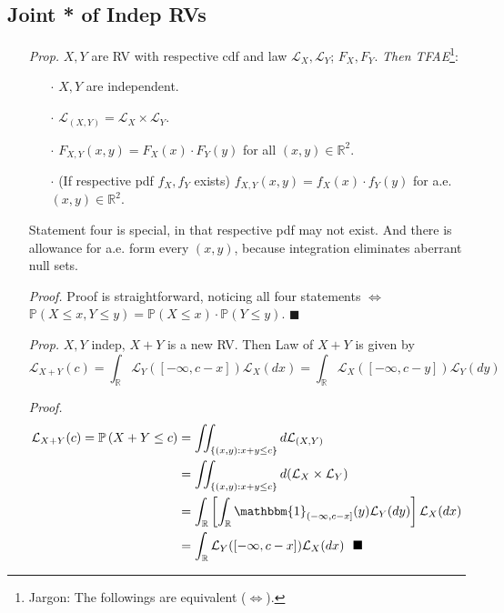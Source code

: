 \documentclass[a4paper,12pt,twoside]{book}
\begin{document}
\subsection{Joint * of Indep RVs}
\begin{itemize}
	\item[\textit{Prop.}] $X,Y$ are RV with respective cdf and law $\mathcal{L}_X, \mathcal{L}_Y$; $F_X, F_Y$. \textit{Then TFAE}\footnote{Jargon: The followings are equivalent ($\iff$).}:
	\begin{itemize}
		\item[$\cdot$] $X,Y$ are independent.
		\item[$\cdot$] $\mathcal{L}_{(X,Y)}=\mathcal{L}_X \times \mathcal{L}_Y$.
		\item[$\cdot$] $F_{X,Y}(x,y)=F_X(x)\cdot F_Y(y)$ for all $(x,y)\in \mathbb{R}^2$.
		\item[$\cdot$] (If respective pdf $f_X, f_Y$ exists) $f_{X,Y}(x,y)=f_X(x) \cdot f_Y(y)$ for a.e. $(x,y)\in \mathbb{R}^2$.
	\end{itemize}
	Statement four is special, in that respective pdf may not exist. And there is allowance for a.e. form every $(x,y)$, because integration eliminates aberrant null sets.
	\item[\textit{Proof.}] Proof is straightforward, noticing all four statements $\iff$ $\mathbb{P}\left(X\leq x, Y\leq y\right)=\mathbb{P}\left(X\leq x\right)\cdot \mathbb{P}\left(Y\leq y\right)$. $\blacksquare$

	\item[\textit{Prop.}] $X,Y$ indep, $X+Y$ is a new RV. Then Law of $X+Y$ is given by
	$$\mathcal{L}_{X+Y}(c)=\int_{\mathbb{R}}\mathcal{L}_Y([-\infty, c-x])\mathcal{L}_X(dx)=\int_{\mathbb{R}}\mathcal{L}_X([-\infty, c-y])\mathcal{L}_Y(dy)$$

	\item[\textit{Proof.}] 
	\begin{equation}
		\begin{split}
			\mathcal{L}_{X+Y}(c)=\mathbb{P}\left(X+Y\leq c\right)&=\iint_{\{(x,y):x+y\leq c\}}d \mathcal{L}_{(X,Y)}\\
			&=\iint_{\{(x,y):x+y\leq c\}}d (\mathcal{L}_{X}\times \mathcal{L}_Y)\\
			&=\int_{\mathbb{R}}\left[\int_{\mathbb{R}}\mathbbm{1}_{(-\infty,c-x]}(y)\mathcal{L}_Y(dy)\right]\mathcal{L}_X(dx)\\
			&=\int_{\mathbb{R}}\mathcal{L}_Y([-\infty, c-x])\mathcal{L}_X(dx)~~\blacksquare
		\end{split}
	\end{equation}
\end{itemize}
\end{document}

